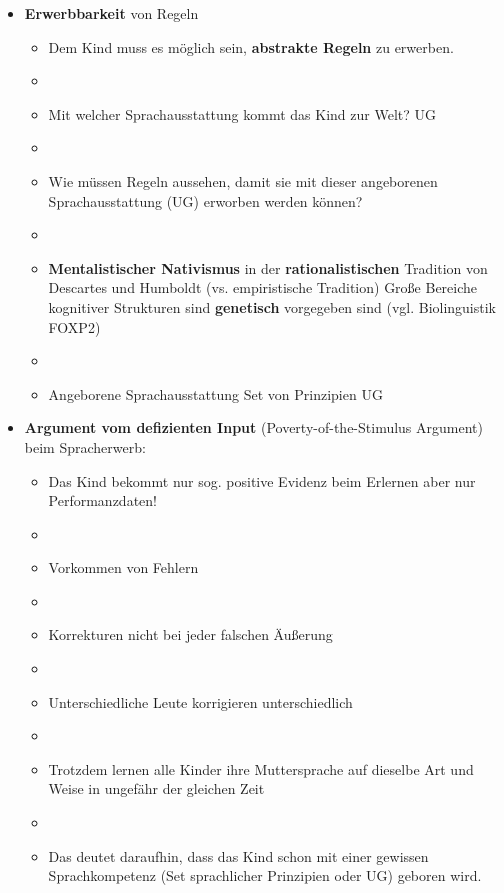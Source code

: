 \begin{frame}

\begin{itemize}
	\item \textbf{Erwerbbarkeit} von Regeln 
	\begin{itemize}
		\item Dem Kind muss es möglich sein, \textbf{abstrakte Regeln} zu erwerben.
		\item[]
		\item Mit welcher Sprachausstattung kommt das Kind zur Welt? \ras UG
		\item[]
		\item Wie müssen Regeln aussehen, damit sie mit dieser angeborenen Sprachausstattung (UG) erworben werden können?
		\item[]
		\item \textbf{Mentalistischer Nativismus} in der \textbf{rationalistischen} Tradition von Descartes und Humboldt (vs. empiristische Tradition) \ras Große Bereiche kognitiver Strukturen sind \textbf{genetisch} vorgegeben sind (vgl. Biolinguistik \ras FOXP2) \citep[vgl.][]{Hornstein05a}
		\item[]
		\item Angeborene Sprachausstattung \ras Set von Prinzipien \ras UG		
	\end{itemize}
\end{itemize}

\end{frame}


\begin{frame}

\begin{itemize}
	\item \textbf{Argument vom defizienten Input} (Poverty-of-the-Stimulus Argument) beim Spracherwerb:
	
	\begin{itemize}
		\item Das Kind bekommt nur sog. positive Evidenz beim Erlernen \ras aber nur Performanzdaten!
		\item[]
		\item Vorkommen von Fehlern
		\item[]
		\item Korrekturen \ras nicht bei jeder falschen Äußerung
		\item[]
		\item Unterschiedliche Leute korrigieren unterschiedlich
		\item[]
		\item Trotzdem lernen alle Kinder ihre Muttersprache auf dieselbe Art und Weise in ungefähr der gleichen Zeit \citep[vgl.][18ff.]{Philippi&Tewes10a}
		\item[]
		\item Das deutet daraufhin, dass das Kind schon mit einer gewissen Sprachkompetenz (Set sprachlicher Prinzipien oder UG) geboren wird.

	\end{itemize}

\end{itemize}

\end{frame}


